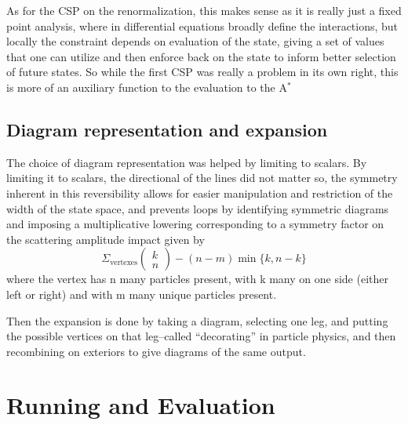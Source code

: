 \documentclass{article}
\begin{document}
\hspace{0.5 cm}As for the CSP on the renormalization, this makes sense as it is really just a fixed point analysis, where in differential equations broadly define the interactions, but locally the constraint depends on evaluation of the state, giving a set of values that one can utilize and then enforce back on the state to inform better selection of future states. So while the first CSP was really a problem in its own right, this is more of an auxiliary function to the evaluation to the A$^*$
\subsection{Diagram representation and expansion}
\hspace{0.5 cm} The choice of diagram representation was helped by limiting to scalars. By limiting it to scalars, the directional of the lines did not matter so, the symmetry inherent in this reversibility allows for easier manipulation and restriction of the width of the state space, and prevents loops by identifying symmetric diagrams and imposing a multiplicative lowering corresponding to a symmetry factor on the scattering amplitude impact given by 
\begin{equation}
	\Sigma_{\textrm{vertexes}} \left( \begin{array}{c} k \\ n \end{array} \right)- (n-m) \min\{k, n-k\}  
\end{equation}
where the vertex has n many particles present, with k many on one side (either left or right) and with m many unique particles present. 

\hspace{0.5 cm} Then the expansion is done by taking a diagram, selecting one leg, and putting the possible vertices on that leg--called ``decorating'' in particle physics, and then recombining on exteriors to give diagrams of the same output.
\section{Running and Evaluation}
\end{document}
